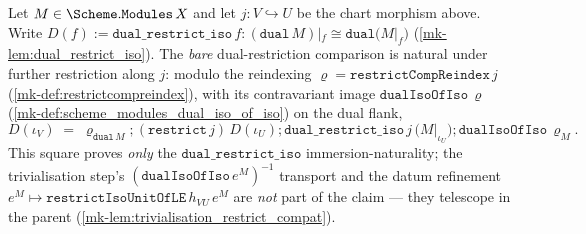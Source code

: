 \begin{lemma}\label{mk-lem:dual_restrict_iso_restrict_compat}
  \leanok

  Let \(M \in \Scheme.\mathtt{Modules}\,X\) and let \(j : V \hookrightarrow U\) be the chart
  morphism above. Write \(D(f) := \mathtt{dual\_restrict\_iso}\,f :
  (\mathtt{dual}\,M)|_f \cong \mathtt{dual}\bigl(M|_f\bigr)\) (\ref{mk-lem:dual_restrict_iso}). The
  \emph{bare} dual-restriction comparison is natural under further restriction along \(j\): modulo
  the reindexing \(\varrho = \mathtt{restrictCompReindex}\,j\) (\ref{mk-def:restrictcompreindex}),
  with its contravariant image \(\mathtt{dualIsoOfIso}\,\varrho\)
  (\ref{mk-def:scheme_modules_dual_iso_of_iso}) on the dual flank,
  \[
    D(\iota_V)
      \;=\; \varrho_{\mathtt{dual}\,M}
        \mathbin{;} (\mathtt{restrict}\,j)\,D(\iota_U)
        \mathbin{;} \mathtt{dual\_restrict\_iso}\,j\,\bigl(M|_{\iota_U}\bigr)
        \mathbin{;} \mathtt{dualIsoOfIso}\,\varrho_M .
  \]
  This square proves \emph{only} the \(\mathtt{dual\_restrict\_iso}\) immersion-naturality; the
  trivialisation step's \((\mathtt{dualIsoOfIso}\,e^M)^{-1}\) transport and the datum refinement
  \(e^M \mapsto \mathtt{restrictIsoUnitOfLE}\,h_{VU}\,e^M\) are \emph{not} part of the claim --- they
  telescope in the parent (\ref{mk-lem:trivialisation_restrict_compat}).
\end{lemma}
